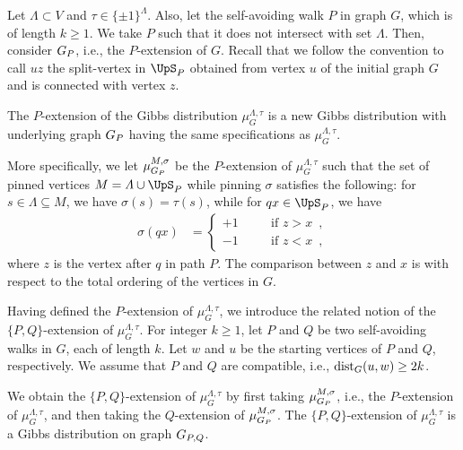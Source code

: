 \documentclass[11pt,reqno]{amsart}
\numberwithin{equation}{section}
\newcommand{\amethyst}[1]{{\color{amethyst}#1} }
\newcommand{\blue}[1]{{\color{blue}#1}}
\newcommand{\bluepigment}[1]{{\color{blue(pigment)}#1}}
\newcommand{\cadmiumgreen}[1]{{\color{cadmiumgreen}#1}}
\newcommand{\goldenbrown}[1]{{\color{goldenbrown}#1}}
\newcommand{\heliotrope}[1]{{\color{heliotrope}#1}}
\newcommand{\red}[1]{{\color{red}#1}}
\newcommand{\dist}{{\rm dist}}
\renewcommand{\amethyst}[1]{#1}
\renewcommand{\blue}[1]{#1}
\renewcommand{\bluepigment}[1]{#1}
\renewcommand{\cadmiumgreen}[1]{#1}
\renewcommand{\goldenbrown}[1]{#1}
\renewcommand{\heliotrope}[1]{#1}
\renewcommand{\red}[1]{#1}
\newcommand{\kk}{\bluepigment{k}}
\newcommand{\kP}{\goldenbrown{P}}
\newcommand{\kQ}{\amethyst{Q}}
\newcommand{\kq}{\amethyst{q}}
\newcommand{\ks}{\cadmiumgreen{s}}
\newcommand{\ku}{\red{u}}
\newcommand{\kw}{\blue{w}}
\newcommand{\kx}{\heliotrope{x}}
\newcommand{\kz}{\cadmiumgreen{z}}
\renewcommand{\kk}{k}
\renewcommand{\kP}{P}
\renewcommand{\kQ}{Q}
\renewcommand{\kq}{q}
\renewcommand{\ks}{s}
\renewcommand{\ku}{u}
\renewcommand{\kw}{w}
\renewcommand{\kx}{x}
\renewcommand{\kz}{z}
\begin{document}
Let $\Lambda\subset V$ and $\tau\in \{\pm 1\}^{\Lambda}$. 
Also, let the self-avoiding walk $\kP$ in graph $G$, which is of length $\kk \geq 1$. 
We take $\kP$ such that it does not intersect with set $\Lambda$. 
%
Then, consider $\gext{G}{\kP}$, i.e., the $\kP$-extension of $G$. 
Recall  that we follow the convention to call $\ku\kz$ the split-vertex in $\ssplit_{\kP}$ obtained from 
vertex $\ku$ of the initial graph $G$ and is connected with vertex $\kz$.



The $\kP$-extension of the Gibbs distribution $\mu^{\Lambda,\tau}_G$
%
 is a new Gibbs distribution with underlying graph $\gext{G}{\kP}$ having the same specifications as
$\mu^{\Lambda,\tau}_G$.

More specifically, we let $\mu^{M,\sigma}_{\gext{G}{\kP}}$ be the $\kP$-extension of $\mu^{\Lambda,\tau}_G$
such that the set of pinned vertices $M=\Lambda\cup \ssplit_{\kP}$ while pinning $\sigma$ satisfies the
following:
% 
 for $\ks \in \Lambda\subseteq M$, we have $\sigma(\ks)=\tau(\ks)$, while 
for $\kq\kx\in \ssplit_{\kP}$, we have
\begin{align}\label{eq:DefOfTau_x}
% 
\sigma(\kq\kx) &= \left\{
\begin{array}{lcl}
+1& \quad & \textrm{if $\kz>\kx$}\enspace,\\ 
-1& \quad &\textrm{if $\kz<\kx$} \enspace,
\end{array}
\right. 
\end{align}
where $\kz$ is the vertex after $\kq$ in path $\kP$. The comparison between $\kz$ and $\kx$ is with respect to the total ordering 
of the vertices in $G$. 
%



Having defined the $\kP$-extension of $\mu^{\Lambda,\tau}_G$, 
we introduce the related notion of the $\{\kP,\kQ\}$-extension of $\mu^{\Lambda,\tau}_G$.
%
For integer $\kk\geq 1$, let $\kP$ and $\kQ$ be two self-avoiding walks in $G$, each of 
length $\kk$. Let $\kw$ and $\ku$ be the starting vertices of $\kP$ and $\kQ$, respectively. 
%
 We assume that $\kP$ and $\kQ$ are compatible, i.e., $\dist_{G}(\ku,\kw)\geq 2\kk$.


We obtain the $\{\kP,\kQ \}$-extension of $\mu^{\Lambda,\tau}_G$ by first taking $\mu^{M,\sigma}_{\gext{G}{\kP}}$, i.e., 
 the $\kP$-extension of $\mu^{\Lambda,\tau}_G$, and then taking the $\kQ$-extension of $\mu^{M,\sigma}_{\gext{G}{\kP}}$. 
The $\{\kP,\kQ\}$-extension of $\mu^{\Lambda,\tau}_G$ is a Gibbs distribution on graph $\gext{G}{\kP,\kQ}$. 
\end{document}
